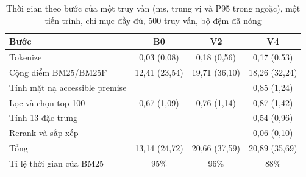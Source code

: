 \begin{table}[htbp]
\centering
\caption[Thời gian theo bước của một truy vấn]{Thời gian theo bước của một truy vấn (ms, trung vị và P95 trong ngoặc), một tiến trình, chỉ mục đầy đủ, 500 truy vấn, bộ đệm đã nóng}\label{tab:profile}
\begin{tabular}{@{}lccc@{}}
\toprule
Bước & B0 & V2 & V4 \\
\midrule
Tokenize & 0,03 (0,08) & 0,18 (0,56) & 0,17 (0,53) \\
Cộng điểm BM25/BM25F & 12,41 (23,54) & 19,71 (36,10) & 18,26 (32,24) \\
Tính mặt nạ accessible premise &  &  & 0,85 (1,24) \\
Lọc và chọn top 100 & 0,67 (1,09) & 0,76 (1,14) & 0,87 (1,42) \\
Tính 13 đặc trưng &  &  & 0,54 (0,96) \\
Rerank và sắp xếp &  &  & 0,06 (0,10) \\
\midrule
Tổng & 13,14 (24,72) & 20,66 (37,59) & 20,89 (35,69) \\
Tỉ lệ thời gian của BM25 & 95\% & 96\% & 88\% \\
\bottomrule
\end{tabular}
\end{table}
